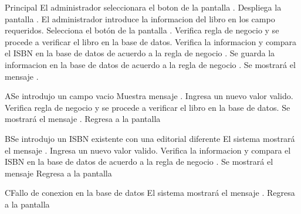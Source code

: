 \begin{UCtrayectoria}{Principal}
	\UCpaso[\UCactor] El administrador seleccionara el boton  de la pantalla .
	\UCpaso[\UCsist] Despliega la pantalla .
	\UCpaso[\UCactor] El administrador introduce la informacion del libro en los campo requeridos.
	\UCpaso[\UCactor] Selecciona el botón  de la pantalla .
	\UCpaso[\UCsist] Verifica regla de negocio  y se procede a verificar el libro en la base de datos.
	\UCpaso[\UCsist] Verifica la informacion y compara el ISBN en la base de datos de acuerdo a la regla de negocio  .
	\UCpaso[\UCsist] Se guarda la informacion en la base de datos de acuerdo a la regla de negocio  .
	\UCpaso[\UCsist] Se mostrará el mensaje .
\end{UCtrayectoria}
\begin{UCtrayectoriaA}{A}{Se introdujo un campo vacio}	
			\UCpaso[\UCsist] Muestra mensaje .
			\UCpaso[\UCactor] Ingresa un nuevo valor valido.
			\UCpaso[\UCsist] Verifica regla de negocio  y se procede a verificar el libro en la base de datos.
			\UCpaso[\UCsist] Se mostrará el mensaje .
			\UCpaso[\UCsist] Regresa a la pantalla 			
\end{UCtrayectoriaA}
\begin{UCtrayectoriaA}{B}{Se introdujo un ISBN existente con una editorial diferente}	
			\UCpaso[\UCsist] El sistema mostrará el mensaje .
			\UCpaso[\UCactor] Ingresa un nuevo valor valido.
			\UCpaso[\UCsist] Verifica la informacion y compara el ISBN en la base de datos de acuerdo a la regla de negocio  .
			\UCpaso[\UCsist] Se mostrará el mensaje 
			\UCpaso[\UCsist] Regresa a la pantalla 	
\end{UCtrayectoriaA}
\begin{UCtrayectoriaA}{C}{Fallo de conexion en la base de datos}
			\UCpaso[\UCsist] El sistema mostrará el mensaje .
			\UCpaso[\UCsist] Regresa a la pantalla 	
\end{UCtrayectoriaA}
